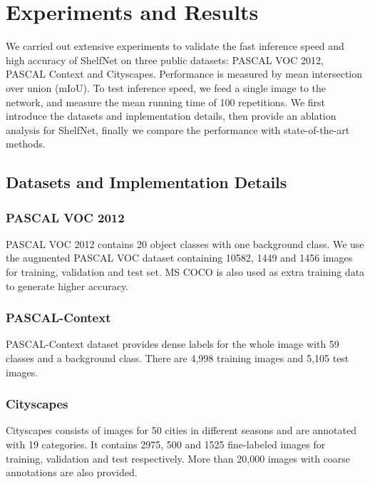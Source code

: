 \documentclass[10pt,twocolumn,letterpaper]{article}
\begin{document}
\section{Experiments and Results}
We carried out extensive experiments to validate the fast inference speed and high accuracy of ShelfNet on three public datasets: PASCAL VOC 2012, PASCAL Context and Cityscapes. Performance is measured by mean intersection over union (mIoU). To test inference speed, we feed a single image to the network, and measure the mean running time of 100 repetitions. We first introduce the datasets and inplementation details, then provide an ablation analysis for ShelfNet, finally we compare the performance with state-of-the-art methods.





\subsection{Datasets and Implementation Details}

\subsubsection{PASCAL VOC 2012}
PASCAL VOC 2012 \cite{everingham2015pascal} contains 20 object classes with one background class. We use the augmented PASCAL VOC dataset \cite{hariharan2015hypercolumns} containing 10582,  1449 and 1456 images for training, validation and test set. MS COCO \cite{lin2014microsoft} is also used as extra training data to generate higher accuracy. 

\subsubsection{PASCAL-Context}

PASCAL-Context dataset \cite{mottaghi2014role} provides dense labels for the whole image with 59 classes and a background class. There are 4,998 training images and 5,105 test images. 

\subsubsection{Cityscapes}

Cityscapes \cite{cordts2016cityscapes} consists of images for 50 cities in different seasons and are annotated with 19 categories. It contains 2975, 500 and 1525 fine-labeled images for training, validation and test respectively. More than 20,000 images with coarse annotations are also provided.
\end{document}
